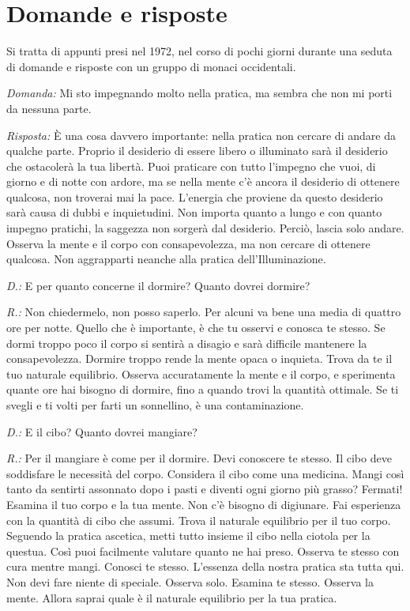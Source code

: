 \chapter{Domande e risposte}

\begin{openingQuote}
  \centering

  Si tratta di appunti presi nel 1972, nel corso di pochi giorni durante una
  seduta di domande e risposte con un gruppo di monaci occidentali.
\end{openingQuote}

\emph{Domanda:} Mi sto impegnando molto nella pratica, ma sembra che non mi
porti da nessuna parte.

\emph{Risposta:} È una cosa davvero importante: nella pratica non cercare di
andare da qualche parte. Proprio il desiderio di essere libero o
illuminato sarà il desiderio che ostacolerà la tua libertà. Puoi
praticare con tutto l'impegno che vuoi, di giorno e di notte con ardore,
ma se nella mente c'è ancora il desiderio di ottenere qualcosa, non
troverai mai la pace. L'energia che proviene da questo desiderio sarà
causa di dubbi e inquietudini. Non importa quanto a lungo e con quanto
impegno pratichi, la saggezza non sorgerà dal desiderio. Perciò, lascia
solo andare. Osserva la mente e il corpo con consapevolezza, ma non
cercare di ottenere qualcosa. Non aggrapparti neanche alla pratica
dell'Illuminazione.

\emph{D.:} E per quanto concerne il dormire? Quanto dovrei dormire?

\emph{R.:} Non chiedermelo, non posso saperlo. Per alcuni va bene una media di
quattro ore per notte. Quello che è importante, è che tu osservi e
conosca te stesso. Se dormi troppo poco il corpo si sentirà a disagio e
sarà difficile mantenere la consapevolezza. Dormire troppo rende la
mente opaca o inquieta. Trova da te il tuo naturale equilibrio. Osserva
accuratamente la mente e il corpo, e sperimenta quante ore hai bisogno
di dormire, fino a quando trovi la quantità ottimale. Se ti svegli e ti
volti per farti un sonnellino, è una contaminazione.

\emph{D.:} E il cibo? Quanto dovrei mangiare?

\emph{R.:} Per il mangiare è come per il dormire. Devi conoscere te stesso. Il
cibo deve soddisfare le necessità del corpo. Considera il cibo come una
medicina. Mangi così tanto da sentirti assonnato dopo i pasti e diventi
ogni giorno più grasso? Fermati! Esamina il tuo corpo e la tua mente.
Non c'è bisogno di digiunare. Fai esperienza con la quantità di cibo che
assumi. Trova il naturale equilibrio per il tuo corpo. Seguendo la
pratica ascetica, metti tutto insieme il cibo nella ciotola per la
questua. Così puoi facilmente valutare quanto ne hai preso. Osserva te
stesso con cura mentre mangi. Conosci te stesso. L'essenza della nostra
pratica sta tutta qui. Non devi fare niente di speciale. Osserva solo.
Esamina te stesso. Osserva la mente. Allora saprai quale è il naturale
equilibrio per la tua pratica.

